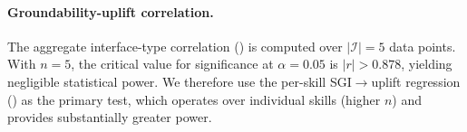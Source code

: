\paragraph{Groundability-uplift correlation.}
The aggregate interface-type correlation () is computed over $|\mathcal{I}| = 5$ data points.
With $n = 5$, the critical value for significance at $\alpha = 0.05$ is $|r| > 0.878$, yielding negligible statistical power.
We therefore use the per-skill \textsc{SGI}$\to$uplift regression () as the primary test, which operates over individual skills (higher $n$) and provides substantially greater power.
